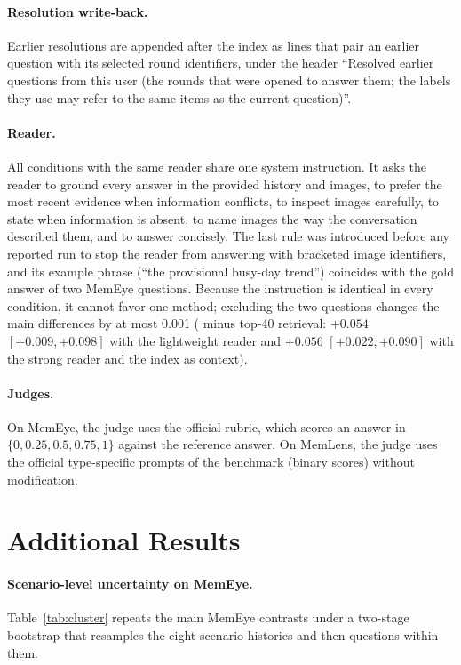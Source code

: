 \paragraph{Resolution write-back.} Earlier resolutions are appended after the index as lines that pair an earlier question with its selected round identifiers, under the header ``Resolved earlier questions from this user (the rounds that were opened to answer them; the labels they use may refer to the same items as the current question)''.

\paragraph{Reader.} All conditions with the same reader share one system instruction. It asks the reader to ground every answer in the provided history and images, to prefer the most recent evidence when information conflicts, to inspect images carefully, to state when information is absent, to name images the way the conversation described them, and to answer concisely. The last rule was introduced before any reported run to stop the reader from answering with bracketed image identifiers, and its example phrase (``the provisional busy-day trend'') coincides with the gold answer of two MemEye questions. Because the instruction is identical in every condition, it cannot favor one method; excluding the two questions changes the main differences by at most 0.001 (\qss{} minus top-40 retrieval: $+0.054$ $[+0.009, +0.098]$ with the lightweight reader and $+0.056$ $[+0.022, +0.090]$ with the strong reader and the index as context).

\paragraph{Judges.} On MemEye, the judge uses the official rubric, which scores an answer in $\{0, 0.25, 0.5, 0.75, 1\}$ against the reference answer. On MemLens, the judge uses the official type-specific prompts of the benchmark (binary scores) without modification.

\section{Additional Results}
\label{app:results}

\paragraph{Scenario-level uncertainty on MemEye.} Table~\ref{tab:cluster} repeats the main MemEye contrasts under a two-stage bootstrap that resamples the eight scenario histories and then questions within them.


